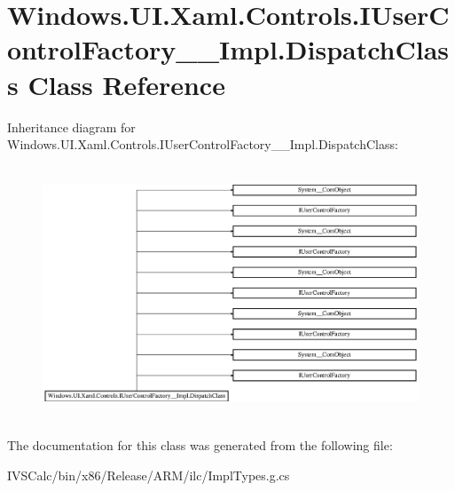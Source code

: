 \hypertarget{class_windows_1_1_u_i_1_1_xaml_1_1_controls_1_1_i_user_control_factory_____impl_1_1_dispatch_class}{}\section{Windows.\+U\+I.\+Xaml.\+Controls.\+I\+User\+Control\+Factory\+\_\+\+\_\+\+Impl.\+Dispatch\+Class Class Reference}
\label{class_windows_1_1_u_i_1_1_xaml_1_1_controls_1_1_i_user_control_factory_____impl_1_1_dispatch_class}
Inheritance diagram for Windows.\+U\+I.\+Xaml.\+Controls.\+I\+User\+Control\+Factory\+\_\+\+\_\+\+Impl.\+Dispatch\+Class\+:\begin{figure}[H]
\begin{center}
\leavevmode
\includegraphics[height=7.586207cm]{class_windows_1_1_u_i_1_1_xaml_1_1_controls_1_1_i_user_control_factory_____impl_1_1_dispatch_class}
\end{center}
\end{figure}


The documentation for this class was generated from the following file\+:\begin{DoxyCompactItemize}
\item 
I\+V\+S\+Calc/bin/x86/\+Release/\+A\+R\+M/ilc/Impl\+Types.\+g.\+cs\end{DoxyCompactItemize}
